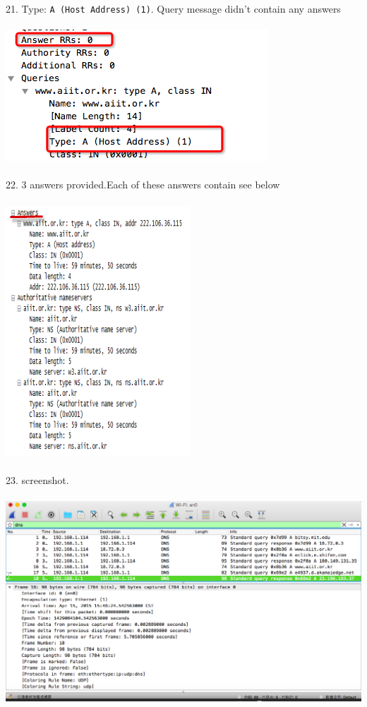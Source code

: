 \documentclass[a4paper]{article}
\begin{document}
{	21. Type: \verb|A (Host Address) (1)|. Query message didn't contain any answers\\\\
	{\centering\includegraphics[scale=0.5]{Illustrations/21.png}}\\\\
	22. 3 answers provided.Each of these answers contain see below\\\\
	{\centering\includegraphics[scale=0.5]{Illustrations/22.png}}\\\\
	23. screenshot.\\\\
	{\centering\includegraphics[scale=0.4]{Illustrations/23.png}}\\\\
}

\end{document}

